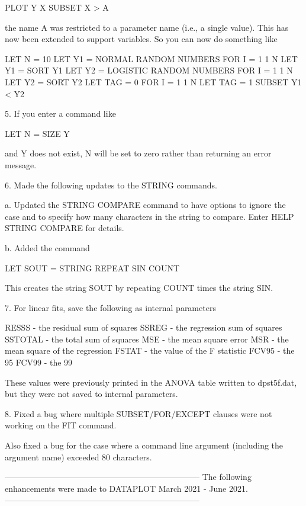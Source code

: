          PLOT Y X  SUBSET X > A

    the name A was restricted to a parameter name (i.e., a single
    value).  This has now been extended to support variables.  So
    you can now do something like

         LET N = 10
         LET Y1 = NORMAL RANDOM NUMBERS FOR I = 1 1 N
         LET Y1 = SORT Y1
         LET Y2 = LOGISTIC RANDOM NUMBERS FOR I = 1 1 N
         LET Y2 = SORT Y2
         LET TAG = 0 FOR I = 1 1 N
         LET TAG = 1 SUBSET Y1 < Y2

 5. If you enter a command like

       LET N = SIZE Y

    and Y does not exist, N will be set to zero rather than
    returning an error message.

 6. Made the following updates to the STRING commands.

    a. Updated the STRING COMPARE command to have options to
       ignore the case and to specify how many characters in
       the string to compare.  Enter HELP STRING COMPARE for
       details.

    b. Added the command

           LET SOUT = STRING REPEAT SIN COUNT

       This creates the string SOUT by repeating COUNT times
       the string SIN.

 7. For linear fits, save the following as internal parameters

       RESSS   - the residual sum of squares
       SSREG   - the regression sum of squares
       SSTOTAL - the total sum of squares
       MSE     - the mean square error
       MSR     - the mean square of the regression
       FSTAT   - the value of the F statistic
       FCV95   - the 95%
       FCV99   - the 99%

    These values were previously printed in the ANOVA table written to
    dpst5f.dat, but they were not saved to internal parameters.

 8. Fixed a bug where multiple SUBSET/FOR/EXCEPT clauses were not
    working on the FIT command.

    Also fixed a bug for the case where a command line argument
    (including the argument name) exceeded 80 characters.

-----------------------------------------------------------------------
The following enhancements were made to DATAPLOT
March 2021 - June 2021.
-----------------------------------------------------------------------

